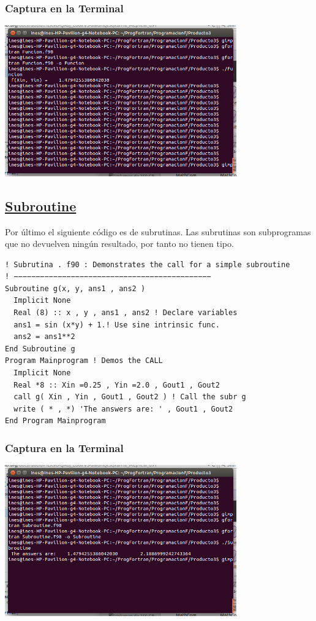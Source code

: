 \documentclass[a4paper]{article}
\begin{document}
\subsubsection{Captura en la Terminal}
 \begin{center}
\includegraphics[width=10cm]{Funcion.png}
\end{center}
    
\subsection{\underline{Subroutine}}
  Por último el siguiente código es de subrutinas. Las subrutinas son subprogramas que no devuelven ningún resultado, por tanto no tienen tipo.  
    
\begin{verbatim}
! Subrutina . f90 : Demonstrates the call for a simple subroutine
! −−−−−−−−−−−−−−−−−−−−−−−−−−−−−−−−−−−−−−−−−−−−−
Subroutine g(x, y, ans1 , ans2 )
  Implicit None
  Real (8) :: x , y , ans1 , ans2 ! Declare variables
  ans1 = sin (x*y) + 1.! Use sine intrinsic func.
  ans2 = ans1**2
End Subroutine g
Program Mainprogram ! Demos the CALL
  Implicit None
  Real *8 :: Xin =0.25 , Yin =2.0 , Gout1 , Gout2
  call g( Xin , Yin , Gout1 , Gout2 ) ! Call the subr g
  write ( * , *) 'The answers are: ' , Gout1 , Gout2
End Program Mainprogram
\end{verbatim}
    
\subsubsection{Captura en la Terminal}
 \begin{center}
\includegraphics[width=10cm]{Subroutine.png}
\end{center}
\end{document}
